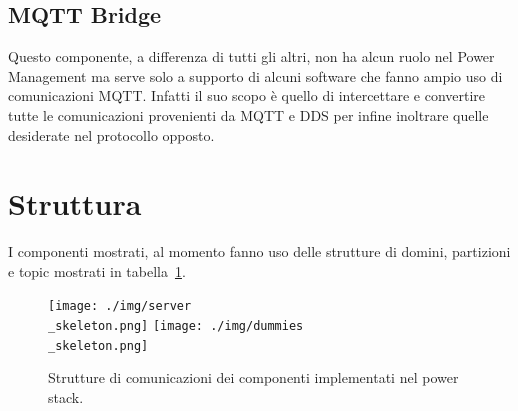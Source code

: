 \subsection*{MQTT Bridge}
Questo componente, a differenza di tutti gli altri, non ha alcun ruolo nel Power Management ma serve solo a supporto di alcuni software che fanno ampio uso di comunicazioni MQTT\cite{mqtt}. Infatti il suo scopo è quello di intercettare e convertire tutte le comunicazioni provenienti da MQTT e DDS per infine inoltrare quelle desiderate nel protocollo opposto.%

\section{Struttura}
I componenti mostrati, al momento fanno uso delle strutture di domini, partizioni e topic mostrati in tabella~\ref{fig:dummy_topic}.

\begin{figure}[H]
    \centering
    \texttt{[image: ./img/server\\\_skeleton.png]}
    \texttt{[image: ./img/dummies\\\_skeleton.png]}
    \caption{ Strutture di comunicazioni dei componenti implementati nel power stack.}
    \label{fig:dummy_topic}
\end{figure}
